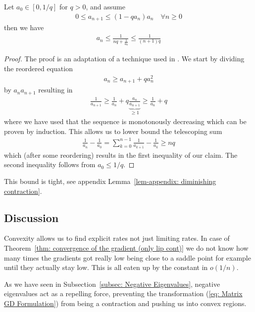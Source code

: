 \begin{lemma}
	\label{lem: upper bound on diminishing contraction}
	Let \(a_0 \in [0, 1/q]\) for \(q>0\), and assume
	\begin{align*}
		0\le a_{n+1} \le (1-q a_n)a_n \quad \forall n \ge 0
	\end{align*}
	then we have
	\begin{align*}
		a_n \le \frac{1}{nq + \frac1{a_0}}\le\frac1{(n+1)q}
	\end{align*}
\end{lemma}
\begin{proof}
	The proof is an adaptation of a technique used in \textcite[Theorem
	2.1.14]{nesterovLecturesConvexOptimization2018}. We start by dividing the
	reordered equation
	\begin{align*}
		a_n \ge a_{n+1} + qa_n^2
	\end{align*}
	by \(a_na_{n+1}\) resulting in
	\begin{align*}
		\frac1{a_{n+1}}
		\ge \frac1{a_n} + q \underbrace{\frac{a_n}{a_{n+1}}}_{\ge 1}
		\ge \frac1{a_n} + q
	\end{align*}
	where we have used that the sequence is monotonously decreasing which
	can be proven by induction. This allows us to lower bound the telescoping
	sum
	\begin{align*}
		\frac1{a_n} - \frac1{a_0}
		= \sum_{k=0}^{n-1} \frac1{a_{k+1}} - \frac1{a_k}
		\ge nq
	\end{align*}
	which (after some reordering) results in the first inequality of our claim.
	The second inequality follows from \(a_0 \le 1/q\).
\end{proof}
\begin{remark}
	This bound is tight, see appendix Lemma~\ref{lem-appendix: diminishing contraction}.
\end{remark}

\subsection{Discussion}

Convexity allows us to find explicit rates not just limiting rates. In case
of Theorem~\ref{thm: convergence of the gradient (only lip cont)} we do not
know how many times the gradients got really low being close to a saddle
point for example until they actually stay low. This is all eaten up by the
constant in \(o(1/n)\).

As we have seen in Subsection~\ref{subsec: Negative Eigenvalues}, negative
eigenvalues act as a repelling force, preventing the transformation (\ref{eq:
Matrix GD Formulation}) from being a contraction and pushing us into convex
regions.

